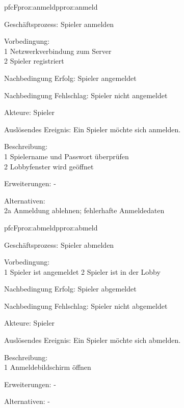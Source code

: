 \begin{description}[leftmargin=3em, style=sameline]
	
	\begin{php}{pfc}{F}{proz:anmeld}{pproz:anmeld}
		\item [Geschäftsprozess:] Spieler anmelden
		\item [Vorbedingung:]\hfill\\
		1 Netzwerkverbindung zum Server \\
		2 Spieler registriert
		\item [Nachbedingung Erfolg:] Spieler angemeldet
		\item [Nachbedingung Fehlschlag:] Spieler nicht angemeldet
		\item [Akteure:] Spieler
		\item [Auslösendes Ereignis:] Ein Spieler möchte sich anmelden.
		\item [Beschreibung:]\hfill\\
		1 Spielername und Passwort überprüfen \\
		2 Lobbyfenster wird geöffnet 
		\item [Erweiterungen:] -
		\item [Alternativen:]\hfill\\
		2a Anmeldung ablehnen; fehlerhafte Anmeldedaten 
	\end{php}
	
	\begin{php}{pfc}{F}{proz:abmeld}{pproz:abmeld}
		\item [Geschäftsprozess:] Spieler abmelden	
		\item [Vorbedingung:]\hfill\\
		1 Spieler ist angemeldet
		2 Spieler ist in der Lobby
		\item [Nachbedingung Erfolg:] Spieler abgemeldet
		\item [Nachbedingung Fehlschlag:] Spieler nicht abgemeldet
		\item [Akteure:] Spieler
		\item [Auslösendes Ereignis:] Ein Spieler möchte sich abmelden.
		\item [Beschreibung:] \hfill\\
		1 Anmeldebildschirm öffnen
		\item [Erweiterungen:] -
		\item [Alternativen:]-		
	\end{php}
	

\end{description}
